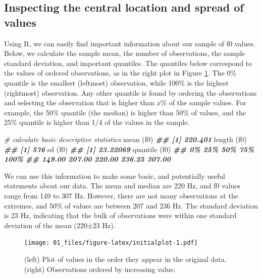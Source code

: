 \documentclass[
]{book}
\newenvironment{Shaded}{\begin{snugshade}}{\end{snugshade}}
\newcommand{\CommentTok}[1]{\textcolor[rgb]{0.56,0.35,0.01}{\textit{#1}}}
\newcommand{\DocumentationTok}[1]{\textcolor[rgb]{0.56,0.35,0.01}{\textbf{\textit{#1}}}}
\newcommand{\FunctionTok}[1]{\textcolor[rgb]{0.00,0.00,0.00}{#1}}
\newcommand{\NormalTok}[1]{#1}
\begin{document}
\hypertarget{inspecting-the-central-location-and-spread-of-values}{%
\subsection{Inspecting the central location and spread of values}\label{inspecting-the-central-location-and-spread-of-values}}

Using R, we can easily find important information about our sample of f0 values. Below, we calculate the sample mean, the number of observations, the sample standard deviation, and important quantiles. The quantiles below correspond to the values of ordered observations, as in the right plot in Figure \ref{fig:initialplot}. The 0\% quantile is the smallest (leftmost) observation, while 100\% is the highest (rightmost) observation. Any other quantile is found by ordering the observations and selecting the observation that is higher than \(x\%\) of the sample values. For example, the 50\% quantile (the median) is higher than 50\% of values, and the 25\% quantile is higher than 1/4 of the values in the sample.

\begin{Shaded}
\begin{Highlighting}[]
\CommentTok{\# calculate basic descriptive statistics}
\FunctionTok{mean}\NormalTok{ (f0)}
\DocumentationTok{\#\# [1] 220.401}
\FunctionTok{length}\NormalTok{ (f0)}
\DocumentationTok{\#\# [1] 576}
\FunctionTok{sd}\NormalTok{ (f0)}
\DocumentationTok{\#\# [1] 23.22069}
\FunctionTok{quantile}\NormalTok{ (f0)}
\DocumentationTok{\#\#     0\%    25\%    50\%    75\%   100\% }
\DocumentationTok{\#\# 149.00 207.00 220.00 236.25 307.00}
\end{Highlighting}
\end{Shaded}

We can use this information to make some basic, and potentially useful statements about our data. The mean and median are 220 Hz, and f0 values range from 149 to 307 Hz. However, there are not many observations at the extremes, and 50\% of values are between 207 and 236 Hz. The standard deviation is 23 Hz, indicating that the bulk of observations were within one standard deviation of the mean (220±23 Hz).

\begin{figure}
\centering
\texttt{[image: 01\_files/figure-latex/initialplot-1.pdf]}
\caption{\label{fig:initialplot}(left) Plot of values in the order they appear in the original data. (right) Observations ordered by increasing value.}
\end{figure}
\end{document}
